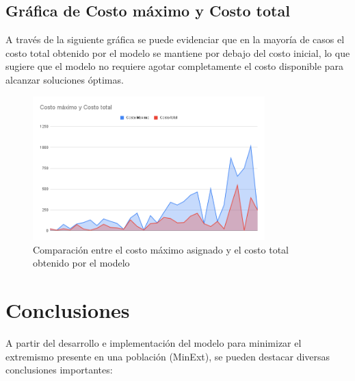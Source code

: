 \documentclass[11pt,letter]{article}
\begin{document}
\subsection{Gráfica de Costo máximo y Costo total}

A través de la siguiente gráfica se puede evidenciar que en la mayoría de casos el costo total obtenido por el modelo se mantiene por debajo del costo inicial, lo que sugiere que el modelo no requiere agotar completamente el costo disponible para alcanzar soluciones óptimas.

\begin{figure}[H]
    \centering
    \includegraphics[width=0.8\textwidth]{resources/costomaximoycostototal.png}
    \caption{Comparación entre el costo máximo asignado y el costo total obtenido por el modelo}
\end{figure}



\section{Conclusiones}

A partir del desarrollo e implementación del modelo para minimizar el extremismo presente en una población (MinExt), se pueden destacar diversas conclusiones importantes:
\end{document}

